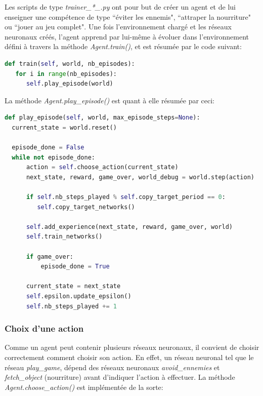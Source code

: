 \documentclass[11pt,a4paper]{report}
\begin{document}
  \par Les scripts de type \textit{trainer\_*\_.py} ont pour but de créer un agent et de lui enseigner une compétence de type ``éviter les ennemis", ``attraper la nourriture" ou ``jouer au jeu complet". Une fois l'environnement chargé et les réseaux neuronaux créés, l'agent apprend par lui-même à évoluer dans l'environnement défini à travers la méthode \textit{Agent.train()}, et est résumée par le code suivant: 
  
  \begin{lstlisting}[language=python]
def train(self, world, nb_episodes):
   for i in range(nb_episodes):
      self.play_episode(world)
  \end{lstlisting} 
  
  \par La méthode \textit{Agent.play\_episode()} est quant à elle résumée par ceci: 
  
  \begin{lstlisting}[language=python]
def play_episode(self, world, max_episode_steps=None):
  current_state = world.reset()

  episode_done = False
  while not episode_done:
      action = self.choose_action(current_state)
      next_state, reward, game_over, world_debug = world.step(action)

      if self.nb_steps_played % self.copy_target_period == 0:
         self.copy_target_networks()

      self.add_experience(next_state, reward, game_over, world)
      self.train_networks()

      if game_over: 
          episode_done = True

      current_state = next_state
      self.epsilon.update_epsilon()
      self.nb_steps_played += 1

  \end{lstlisting} 
  
  \newpage
  \subsubsection{Choix d'une action}
  
  \par Comme un agent peut contenir plusieurs réseaux neuronaux, il convient de choisir correctement comment choisir son action. En effet, un réseau neuronal tel que le réseau \textit{play\_game}, dépend des réseaux neuronaux \textit{avoid\_ennemies} et \textit{fetch\_object} (nourriture) avant d'indiquer l'action à effectuer. La méthode \textit{Agent.choose\_action()} est implémentée de la sorte: 
  
\end{document}
